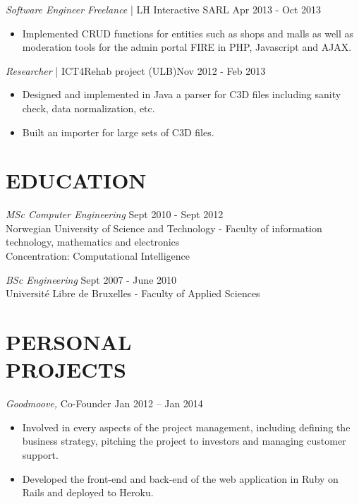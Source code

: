 \documentclass[line, margin]{res}
\begin{document}
\begin{resume}
                {\sl Software Engineer Freelance} | LH Interactive SARL \hfill            Apr 2013 - Oct 2013\\
                 \begin{itemize}  \itemsep -1pt %
                  \item Implemented CRUD functions for entities such as shops and malls as well as moderation tools for the admin portal FIRE in PHP, Javascript and AJAX. 
                 \end{itemize} 

                {\sl Researcher} | ICT4Rehab project (ULB)\hfill        Nov 2012 - Feb 2013 \\
                  \begin{itemize} \itemsep -1pt
                   \item Designed and implemented in Java a parser for C3D files including sanity check, data normalization, etc.
                   \item Built an importer for large sets of C3D files.
                  \end{itemize} 

\section{EDUCATION} {\sl MSc Computer Engineering} \hfill   Sept 2010 - Sept 2012 \\
                    Norwegian University of Science and Technology - Faculty of information technology, mathematics and
                    electronics \\
                    Concentration: Computational Intelligence
 
                    {\sl BSc Engineering} \hfill   Sept 2007 - June 2010 \\
                    Université Libre de Bruxelles - Faculty of Applied Sciences
 
 
\section{PERSONAL \\ PROJECTS} {\sl Goodmoove, } Co-Founder \hfill Jan 2012 – Jan 2014\\
                  \begin{itemize} \itemsep -1pt
                   \item Involved in every aspects of the project management, including defining the business strategy,
                     pitching the project to investors and managing customer support.
                   \item Developed the front-end and back-end of the web application in Ruby on Rails and deployed
                     to Heroku.
                  \end{itemize} 


\end{resume}
\end{document}
